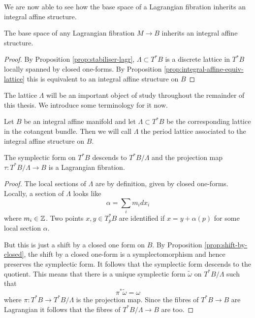 We are now able to see how the base space of a Lagrangian fibration inherits an
integral affine structure.

\begin{corollary} \label{corr:Lag-Fibr-IAS}
    The base space of any Lagrangian fibration $M \to B$ inherits an integral affine structure.
\end{corollary}
\begin{proof}
    By Proposition \ref{prop:stabiliser-lagr}, $\Lambda \subset T^*B$ is a discrete lattice in $T^*B$ locally spanned by closed one-forms. By Proposition \ref{prop:integral-affine-equiv-lattice} this is equivalent to an
    integral affine structure on $B$
\end{proof}
The lattice $\Lambda$ will be an important object of study throughout the remainder of this thesis. We introduce some terminology for it now.
\begin{definition}
    Let $B$ be an integral affine manifold and let $\Lambda \subset T^*B$ be the corresponding lattice in the cotangent bundle. Then
    we will call $\Lambda$ the period lattice associated to the integral affine structure on $B$.
\end{definition}

\begin{theorem}
    The symplectic form on $T^*B$ descends to $T^*B/\Lambda$ and the projection map $\tau : T^*B/\Lambda \to B$ is a
    Lagrangian fibration.
\end{theorem}
\begin{proof}
    The local sections of $\Lambda$ are by definition, given by closed one-forms. Locally, a section of $\Lambda$ looks like $$\alpha = \sum_i m_i dx_i$$
    where $m_i \in \mathbb{Z}$. Two points $x,y \in T_p^*B$ are identified if $x = y + \alpha(p)$ for some local section $\alpha$.

    But this is just a shift by a closed one form on $B$. By Proposition
    \ref{prop:shift-by-closed}, the shift by a closed one-form is a
    symplectomorphism and hence preserves the symplectic form. It follows that the
    symplectic form descends to the quotient. This means that there is a unique
    symplectic form $\tilde{\omega}$ on $T^*B/\Lambda$ such that $$\pi^*
        \tilde{\omega} = \omega$$ where $\pi: T^*B \to T^*B/\Lambda$ is the projection
    map. Since the fibres of $T^*B \to B$ are Lagrangian it follows that the fibres
    of $T^*B/\Lambda \to B$ are too.
\end{proof}

